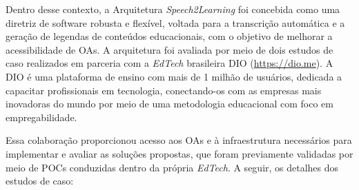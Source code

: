 Dentro desse contexto, a Arquitetura \textit{Speech2Learning} foi concebida como uma diretriz de software robusta e flexível, voltada para a transcrição automática e a geração de legendas de conteúdos educacionais, com o objetivo de melhorar a acessibilidade de OAs. A arquitetura foi avaliada por meio de dois estudos de caso realizados em parceria com a \textit{EdTech} brasileira DIO (\url{https://dio.me}). A DIO é uma plataforma de ensino com mais de 1 milhão de usuários, dedicada a capacitar profissionais em tecnologia, conectando-os com as empresas mais inovadoras do mundo por meio de uma metodologia educacional com foco em empregabilidade. 

Essa colaboração proporcionou acesso aos OAs e à infraestrutura necessários para implementar e avaliar as soluções propostas, que foram previamente validadas por meio de POCs conduzidas dentro da própria \textit{EdTech}. A seguir, os detalhes dos estudos de caso:

